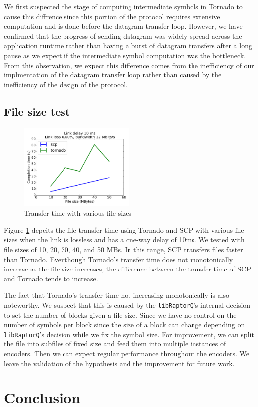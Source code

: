 \documentclass{sig-alternate-10pt}
\begin{document}
We first suspected the stage of computing intermediate symbols in Tornado to
cause this diffrence since this portion of the protocol requires extensive
computation and is done before the datagram transfer loop.  However, we have
confirmed that the progress of sending datagram was widely spread across the
application runtime rather than having a burst of datagram transfers after a
long pause as we expect if the intermediate symbol computation was the
bottleneck. From this observation, we expect this difference comes from the
inefficiency of our implmentation of the datagram transfer loop rather than
caused by the inefficiency of the design of the protocol.

\subsection{File size test}

\begin{figure}[t]
  \centering
  \includegraphics[width=0.5\textwidth]{filesize-plot}
  \caption{Transfer time with various file sizes}
  \label{f:filesize-plot}
\end{figure}

Figure \ref{f:filesize-plot} depcits the file transfer time using Tornado and
SCP with various file sizes when the link is lossless and has a one-way delay of
10ms. We tested with file sizes of 10, 20, 30, 40, and 50 MBs. In this range,
SCP transfers files faster than Tornado. Eventhough Tornado's transfer time does
not monotonically increase as the file size increases, the difference between
the transfer time of SCP and Tornado tends to increase.

The fact that Tornado's transfer time not increasing monotonically is also
noteworthy. We suspect that this is caused by the \texttt{libRaptorQ}'s internal
decision to set the number of blocks given a file size. Since we have no control
on the number of symbols per block since the size of a block can change
depending on \texttt{libRaptorQ}'s decision while we fix the symbol size. For
improvement, we can split the file into subfiles of fixed size and feed them
into multiple instances of encoders. Then we can expect regular performance
throughout the encoders. We leave the validation of the hypothesis and the
improvement for future work.

\section{Conclusion}



\end{document}
